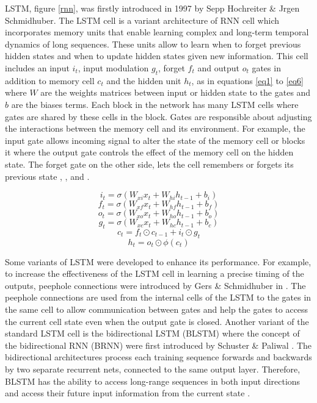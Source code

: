 \documentclass[12pt,a4paper]{article}
\begin{document}
LSTM, figure \ref{rnn}, was firstly introduced  in 1997 by Sepp  Hochreiter \& Jrgen Schmidhuber. The LSTM cell is a variant architecture of  RNN cell which incorporates memory units that enable learning complex and long-term temporal dynamics of long sequences. These units allow to learn when to forget previous hidden states and when to update hidden states given new information. This cell includes an input $i_t$, input modulation $g_t$, forget $f_t$ and output $o_t$ gates in addition to memory cell $c_t$ and the hidden unit $h_t$, as in equations \ref{eq1} to \ref{eq6} where $W$ are the weights matrices between input or hidden state to the gates and $b$ are the biases terms.  Each block in the network has many LSTM cells where gates are shared by these cells in the block. Gates are responsible about adjusting the interactions between the memory cell and its environment. For example, the input gate allows incoming signal  to alter the state of the memory cell or blocks it where the output gate controls the effect of the memory cell on the hidden state. The  forget gate on the other side, lets the cell remembers or forgets its  previous state  \cite{chen2015survey},\cite{chen2016lstm} ,\cite{gers2002learning} and \cite{donahue2015long}.


\begin{equation}\label{eq1}
i_t= \sigma(W_{xi}x_t + W_{hi}h_{t-1}+b_i)
\end{equation}
\begin{equation}\label{eq2}
f_t= \sigma(W_{xf}x_t + W_{hf}h_{t-1}+b_f)
\end{equation}
\begin{equation}\label{eq3}
o_t= \sigma(W_{xo}x_t + W_{ho}h_{t-1}+b_o)
\end{equation}
\begin{equation}\label{eq4}
g_t= \sigma(W_{xc}x_t + W_{hc}h_{t-1}+b_c)
\end{equation}
\begin{equation}\label{eq5}
c_t= f_t \odot	 c_{t-1} +  i_t \odot	g_{t}
\end{equation}
\begin{equation}\label{eq6}
h_t= o_t \odot \phi(c_t)
\end{equation}


Some variants of LSTM were developed to enhance its performance. For example, to increase the effectiveness of the LSTM cell in learning a precise timing of the outputs, peephole connections were introduced  by Gers \& Schmidhuber in \cite{gers2002learning} . The peephole connections are used from the internal cells of the LSTM to the gates in the same cell to allow communication between gates and help the gates to access the current cell state even when the output gate is closed. Another variant of the standard LSTM cell is the bidirectional LSTM (BLSTM) where the concept of the bidirectional RNN (BRNN) were first introduced by Schuster \& Paliwal . The bidirectional architectures process each training sequence forwards and backwards by two separate recurrent nets, connected to the same output layer. Therefore, BLSTM has the ability to access long-range sequences in both input directions and access their future input information from the current state  \cite{graves2005framewise}.
\end{document}
